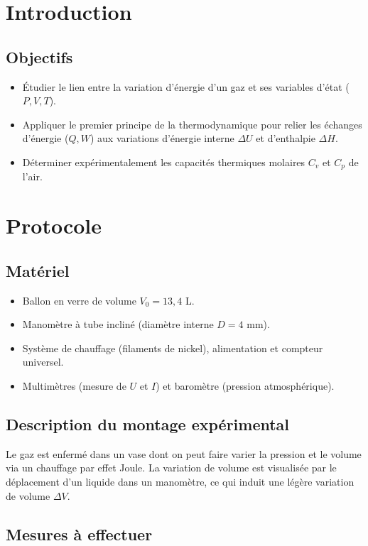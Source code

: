 \documentclass[a4paper,9pt,french]{scrartcl}
\begin{document}
\section{Introduction}
\subsection{Objectifs}
\begin{itemize}
    \item Étudier le lien entre la variation d'énergie d'un gaz et ses variables d'état ($P, V, T$).
    \item Appliquer le premier principe de la thermodynamique pour relier les échanges d'énergie ($Q, W$) aux variations d'énergie interne $\Delta U$ et d'enthalpie $\Delta H$.
    \item Déterminer expérimentalement les capacités thermiques molaires $C_v$ et $C_p$ de l'air.
\end{itemize}
\section{Protocole}
\subsection{Matériel}
\begin{itemize}
    \item Ballon en verre de volume $V_0 = 13,4$ L.
    \item Manomètre à tube incliné (diamètre interne $D = 4$ mm).
    \item Système de chauffage (filaments de nickel), alimentation et compteur universel.
    \item Multimètres (mesure de $U$ et $I$) et baromètre (pression atmosphérique).
\end{itemize}

\subsection{Description du montage expérimental}
Le gaz est enfermé dans un vase dont on peut faire varier la pression et le volume via un chauffage par effet Joule. La variation de volume est visualisée par le déplacement d'un liquide dans un manomètre, ce qui induit une légère variation de volume $\Delta V$.

\subsection{Mesures à effectuer}
\end{document}
